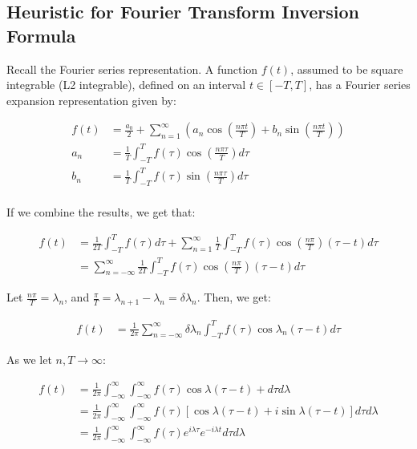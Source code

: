 \documentclass{article}
\theoremstyle{definition}
\begin{document}
\subsection{Heuristic for Fourier Transform Inversion Formula}
Recall the Fourier series representation. A function $f(t)$, assumed to be square integrable (L2 integrable), defined on an interval $t \in [-T,T]$, has a Fourier series expansion representation given by:

\begin{align*}
f(t) &= \frac{a_0}{2} + \sum_{n=1}^{\infty} \left(a_n \cos \left(\frac{n \pi t}{T}\right) + b_n \sin \left(\frac{n \pi t}{T}\right) \right)  \\ 
a_n &= \frac{1}{T} \int_{-T}^{T} f(\tau) \cos \left(\frac{n \pi \tau}{T}\right) d\tau \\
b_n &= \frac{1}{T} \int_{-T}^{T} f(\tau) \sin \left(\frac{n \pi \tau}{T}\right) d\tau \\
\end{align*}

If we combine the results, we get that:

\begin{align*}
f(t) & = \frac{1}{2T} \int_{-T}^T f(\tau) d\tau + \sum_{n=1}^{\infty} \frac{1}{T} \int_{-T}^T f(\tau) \cos \left(\frac{n \pi }{T}\right) (\tau-t) d\tau \\ 
 &= \sum_{n=-\infty}^{\infty} \frac{1}{2T} \int_{-T}^T f(\tau) \cos \left(\frac{n \pi }{T}\right) (\tau-t) d\tau 
\end{align*}

Let $\frac{n \pi }{T} = \lambda_n$, and $\frac{\pi}{T} = \lambda_{n+1} -\lambda_n = \delta \lambda_n$. Then, we get:

\begin{align*}
f(t) &= \frac{1}{2\pi}\sum_{n=-\infty}^{\infty} \delta \lambda_n \int_{-T}^T f(\tau) \cos \lambda_n (\tau-t) d\tau 
\end{align*}

As we let $n, T \to \infty$:


\begin{align*}
f(t) &= \frac{1}{2\pi}\int_{-\infty}^{\infty}  \int_{-\infty}^\infty f(\tau) \cos \lambda (\tau-t) + d\tau d\lambda \\ 
 &= \frac{1}{2\pi}\int_{-\infty}^{\infty}  \int_{-\infty}^\infty f(\tau) \left[\cos \lambda (\tau-t) + i\sin \lambda (\tau-t) \right]d\tau d\lambda \\
 &= \frac{1}{2\pi}\int_{-\infty}^{\infty}  \int_{-\infty}^\infty f(\tau) e^{i\lambda \tau} e^{-i\lambda t}d\tau d\lambda 
\end{align*}
\end{document}
